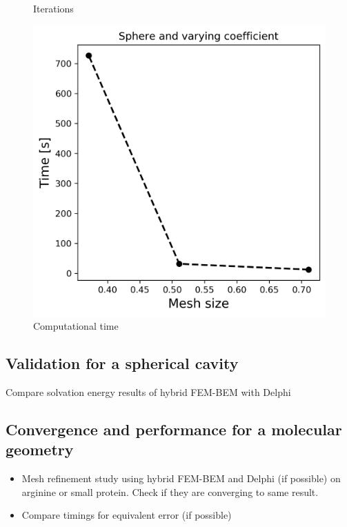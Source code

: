 \begin{itemize}
\begin{figure}[!htb]
  \caption{Iterations}
\endminipage\hfill
{}%
  \includegraphics[width=\linewidth]{Hybrid_FEM_BEM_Sphere_varying_coeff_time.png}
  \caption{Computational time}
\endminipage
\end{figure}
    \end{itemize}

\subsection*{\sffamily \large Validation for a spherical cavity}

Compare solvation energy results of hybrid FEM-BEM with Delphi

\subsection*{\sffamily \large Convergence and performance for a molecular geometry}
\begin{itemize}
    \item Mesh refinement study using hybrid FEM-BEM and Delphi (if possible) on arginine or small protein. Check if they are converging to same result.
    \item Compare timings for equivalent error (if possible)
\end{itemize}

